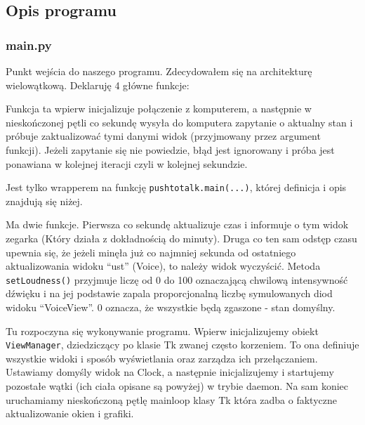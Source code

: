 \documentclass[declaration,shortabstract, inz]{iithesis}
\begin{document}
\subsection{Opis programu}
\subsubsection{main.py}
% 
    Punkt wejścia do naszego programu. Zdecydowałem się na architekturę wielowątkową. Deklaruję 4 główne funkcje:
    \begin{description}[style=nextline]
        \item[omputer\textunderscore{}process]
            Funkcja ta wpierw inicjalizuje połączenie z komputerem, a następnie w nieskończonej pętli co sekundę wysyła do komputera zapytanie o aktualny stan i próbuje zaktualizować tymi danymi widok (przyjmowany przez argument funkcji). Jeżeli zapytanie się nie powiedzie, błąd jest ignorowany i próba jest ponawiana w kolejnej iteracji czyli w kolejnej sekundzie.
        \item[assistant\textunderscore{}process]
            Jest tylko wrapperem na funkcję \texttt{pushtotalk.main(...)}, której definicja i opis znajdują się niżej.
        \item[clock\textunderscore{}process]
            Ma dwie funkcje. Pierwsza co sekundę aktualizuje czas i informuje o tym widok zegarka (Który działa z dokładnością do minuty).
            Druga co ten sam odstęp czasu upewnia się, że jeżeli minęła już co najmniej sekunda od ostatniego aktualizowania widoku ``ust'' (Voice), to należy widok wyczyścić. Metoda \texttt{setLoudness()} przyjmuje liczę od 0 do 100 oznaczającą chwilową intensywność dźwięku i na jej podstawie zapala proporcjonalną liczbę symulowanych diod widoku ``VoiceView''. 0 oznacza, że wszystkie będą zgaszone - stan domyślny.
        \item[main]
            Tu rozpoczyna się wykonywanie programu. Wpierw inicjalizujemy obiekt \texttt{ViewManager}, dziedziczący po klasie Tk zwanej często korzeniem. To ona definiuje wszystkie widoki i sposób wyświetlania oraz zarządza ich przełączaniem.
            Ustawiamy domyśly widok na Clock, a następnie inicjalizujemy i startujemy pozostałe wątki (ich ciała opisane są powyżej) w trybie daemon. Na sam koniec uruchamiamy nieskończoną pętlę mainloop klasy Tk która zadba o faktyczne aktualizowanie okien i grafiki.
    \end{description}
    
\end{document}
